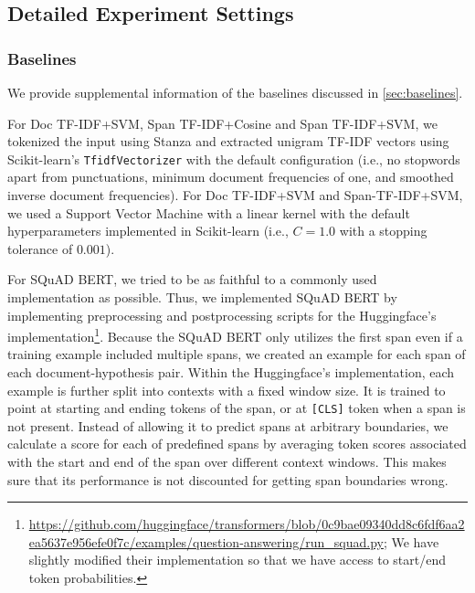 \subsection{Detailed Experiment Settings}

\subsubsection{Baselines}\label{sec:appendix-experiments-baseline}

We provide supplemental information of the baselines discussed in \cref{sec:baselines}.

For Doc TF-IDF+SVM, Span TF-IDF+Cosine and Span TF-IDF+SVM, we tokenized the input using Stanza \cite{qi-etal-2020-stanza} and extracted unigram TF-IDF vectors using Scikit-learn's \cite{pedregosa_2011} \texttt{TfidfVectorizer} with the default configuration (i.e., no stopwords apart from punctuations, minimum document frequencies of one, and smoothed inverse document frequencies).
For Doc TF-IDF+SVM and Span-TF-IDF+SVM, we used a Support Vector Machine \cite[SVM;][]{chang_libsvm_2011} with a linear kernel with the default hyperparameters implemented in Scikit-learn (i.e., $C=1.0$ with a stopping tolerance of $0.001$).



For SQuAD BERT, we tried to be as faithful to a commonly used implementation as possible.
Thus, we implemented SQuAD BERT by implementing preprocessing and postprocessing scripts for the Huggingface's implementation\footnote{\url{https://github.com/huggingface/transformers/blob/0c9bae09340dd8c6fdf6aa2ea5637e956efe0f7c/examples/question-answering/run_squad.py}; We have slightly modified their implementation so that we have access to start/end token probabilities.}.
Because the SQuAD BERT only utilizes the first span even if a training example included multiple spans, we created an example for each span of each document-hypothesis pair.
Within the Huggingface's implementation, each example is further split into contexts with a fixed window size.
It is trained to point at starting and ending tokens of the span, or at \texttt{[CLS]} token when a span is not present.
Instead of allowing it to predict spans at arbitrary boundaries, we calculate a score for each of predefined spans by averaging token scores associated with the start and end of the span over different context windows.
This makes sure that its performance is not discounted for getting span boundaries wrong.


